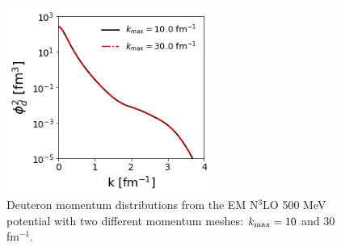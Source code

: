 \documentclass[preprintnumbers,floatfix,aps,prc,preprint,nofootinbib]{revtex4-1}
\begin{document}

%
\begin{figure}[tbh]
    \includegraphics[clip,clip,width=0.6\textwidth]{momentum_distribution_test.png}%
    \caption{Deuteron momentum distributions from the EM N$^3$LO 500 MeV potential with two different momentum meshes: $k_{\rm max}=10$ and $30$ fm$^{-1}$.}
    \label{fig:momentum_distributions}
\end{figure}
%
\end{document}

